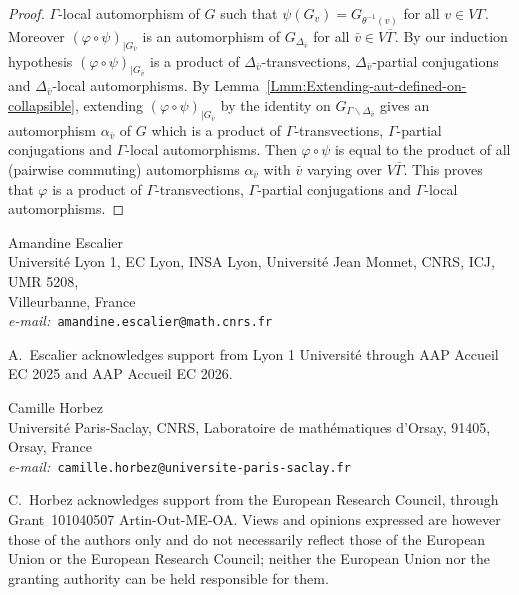 \documentclass[a4paper,english,11pt]{article}
\theoremstyle{definition}
\theoremstyle{remark}
\begin{document}
\begin{proof}
$\Gamma$-local automorphism of $G$ such that $\psi(G_v)=G_{\theta^{-1}(v)}$ for all $v\in V\Gamma$. Moreover $(\varphi\circ\psi)_{|G_{\bar{v}}}$ is an automorphism of $G_{\Delta_{\bar{v}}}$ for all $\bar{v}\in V\overline{\Gamma}$. By our induction hypothesis $(\varphi\circ \psi)_{|G_{\bar{v}}}$ is a product of $\Delta_{\bar{v}}$-transvections,  $\Delta_{\bar{v}}$-partial conjugations and  $\Delta_{\bar{v}}$-local automorphisms. By Lemma~\ref{Lmm:Extending-aut-defined-on-collapsible}, extending $(\varphi\circ \psi)_{|G_{\bar{v}}}$ by the identity on $G_{\Gamma\backslash \Delta_{\bar v}}$ gives an automorphism $\alpha_{\bar v}$ of $G$ which is a product of $\Gamma$-transvections, $\Gamma$-partial conjugations and $\Gamma$-local automorphisms. Then $\varphi\circ \psi$ is equal to the product of all (pairwise commuting) automorphisms $\alpha_{\bar v}$ with $\bar v$ varying over $V\overline{\Gamma}$. This proves that $\varphi$ is a product of $\Gamma$-transvections, $\Gamma$-partial conjugations and $\Gamma$-local automorphisms. 
\end{proof}

\small


\vfill

\vspace{0.5cm}
\begin{flushleft}
  \textcolor{DeepSkyBlue4}{Amandine Escalier}\\ 
  Université Lyon 1, EC Lyon, INSA Lyon, Université Jean Monnet, CNRS, ICJ, UMR 5208,\\ Villeurbanne, France\\
  \emph{e-mail:~}\texttt{amandine.escalier@math.cnrs.fr}
  \medskip
\end{flushleft}
  
\noindent\textcolor{black!70}{\small A.~Escalier acknowledges support from Lyon 1 Université through AAP Accueil EC 2025 and AAP Accueil EC 2026.}

\begin{flushleft}
\textcolor{DeepSkyBlue4}{Camille Horbez}\\ 
Universit\'e Paris-Saclay, CNRS,  Laboratoire de math\'ematiques d'Orsay, 91405, Orsay, France \\
\emph{e-mail:~}\texttt{camille.horbez@universite-paris-saclay.fr}
\medskip
\end{flushleft}

\noindent\textcolor{black!70}{\small C.~Horbez acknowledges support from the European Research Council, through Grant~101040507 Artin-Out-ME-OA. Views and opinions expressed are however those of the authors only and do not necessarily reflect those of the European Union or the European Research Council; neither the European Union nor the granting authority can be held responsible for them.}
\end{document}
